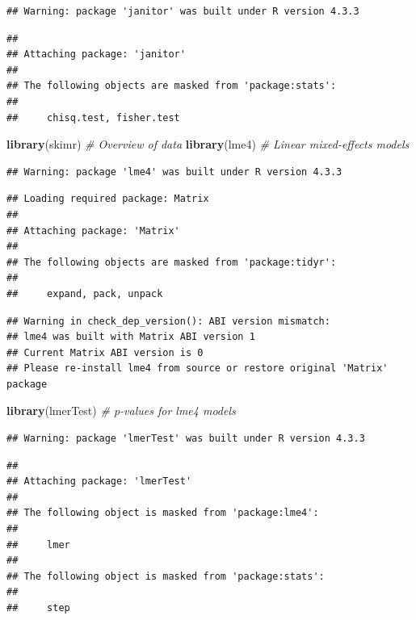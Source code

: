 \documentclass[
]{article}
\newenvironment{Shaded}{\begin{snugshade}}{\end{snugshade}}
\newcommand{\CommentTok}[1]{\textcolor[rgb]{0.56,0.35,0.01}{\textit{#1}}}
\newcommand{\FunctionTok}[1]{\textcolor[rgb]{0.13,0.29,0.53}{\textbf{#1}}}
\newcommand{\NormalTok}[1]{#1}
\begin{document}
\begin{verbatim}
## Warning: package 'janitor' was built under R version 4.3.3
\end{verbatim}

\begin{verbatim}
## 
## Attaching package: 'janitor'
## 
## The following objects are masked from 'package:stats':
## 
##     chisq.test, fisher.test
\end{verbatim}

\begin{Shaded}
\begin{Highlighting}[]
\FunctionTok{library}\NormalTok{(skimr)        }\CommentTok{\# Overview of data}
\FunctionTok{library}\NormalTok{(lme4)         }\CommentTok{\# Linear mixed{-}effects models}
\end{Highlighting}
\end{Shaded}

\begin{verbatim}
## Warning: package 'lme4' was built under R version 4.3.3
\end{verbatim}

\begin{verbatim}
## Loading required package: Matrix
## 
## Attaching package: 'Matrix'
## 
## The following objects are masked from 'package:tidyr':
## 
##     expand, pack, unpack
\end{verbatim}

\begin{verbatim}
## Warning in check_dep_version(): ABI version mismatch: 
## lme4 was built with Matrix ABI version 1
## Current Matrix ABI version is 0
## Please re-install lme4 from source or restore original 'Matrix' package
\end{verbatim}

\begin{Shaded}
\begin{Highlighting}[]
\FunctionTok{library}\NormalTok{(lmerTest)     }\CommentTok{\# p{-}values for lme4 models}
\end{Highlighting}
\end{Shaded}

\begin{verbatim}
## Warning: package 'lmerTest' was built under R version 4.3.3
\end{verbatim}

\begin{verbatim}
## 
## Attaching package: 'lmerTest'
## 
## The following object is masked from 'package:lme4':
## 
##     lmer
## 
## The following object is masked from 'package:stats':
## 
##     step
\end{verbatim}
\end{document}
